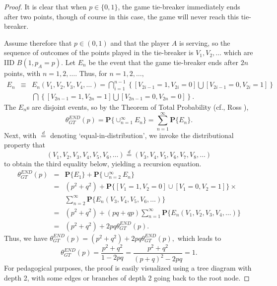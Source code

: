 \documentclass[11pt]{article}
\theoremstyle{plain}
\theoremstyle{definition}
\renewcommand{\Pr}{\mathbf{P}}
\begin{document}
\begin{proof}
    It is clear that when $p \in \{0,1\}$, the game tie-breaker immediately ends after two points, though of course in this case, the game will never reach this tie-breaker.

 Assume therefore that $p \in (0,1)$ and that the player $A$ is serving, so the sequence of outcomes of the points played in the tie-breaker is $V_1, V_2, \ldots$ which are IID $B(1,p_A = p)$. Let $E_n$ be the event that the game tie-breaker ends after $2n$ points, with $n = 1,2,\ldots$. Thus, for $n = 1,2,\ldots,$
    \begin{eqnarray*}
    E_n & \equiv & E_n(V_1, V_2, V_3, V_4, \ldots) 
    =  \bigcap_{i=1}^{n-1} \left\{[ V_{2i-1}  = 1,V_{2i} = 0 ]  \bigcup [ V_{2i-1} = 0, V_{2i} = 1 ] \right\}  \\ && \bigcap \left\{ [ V_{2n-1} = 1, V_{2n} = 1 ] \bigcup [ V_{2n-1} = 0, V_{2n} = 0 ]\right\}.
    \end{eqnarray*}
    The $E_n$s are disjoint events, so by the Theorem of Total Probability (cf., Ross \cite{Ross1998}),
    $$\theta_{GT}^{END}(p) = \Pr\{\cup_{n=1}^\infty E_n\} = \sum_{n=1}^\infty \Pr\{E_n\}.$$
    Next, with $\stackrel{d}{=}$ denoting `equal-in-distribution', we invoke the distributional property that
    $$(V_1,V_2,V_3, V_4, V_5,V_6, \ldots) \stackrel{d}{=} (V_3, V_4, V_5,V_6, V_7,V_8, \ldots)$$
    to obtain the third equality below, yielding a recursion equation.
    \begin{eqnarray*}
        \theta_{GT}^{END}(p) & = & \Pr\{E_1\} + \Pr\{\cup_{n=2}^\infty E_n\} \\
         & =  & (p^2 + q^2) + \Pr\{[V_1=1,V_2=0] \cup [V_1=0,V_2=1]\} \times \\ &&  \sum_{n=2}^\infty \Pr\{E_n(V_3,V_4,V_5,V_6,\ldots)\} \\
        & = & (p^2 + q^2) + (pq + qp) \sum_{n=1}^\infty \Pr\{E_n(V_1,V_2,V_3,V_4,\ldots)\} \\
         & = &  (p^2 + q^2) + 2pq \theta_{GT}^{END}(p).
    \end{eqnarray*}
    Thus, we have
%
    $\theta_{GT}^{END}(p) = (p^2 + q^2) + 2pq \theta_{GT}^{END}(p),$
    which leads to $$\theta_{GT}^{END}(p) = \frac{p^2 + q^2}{1-2pq} = \frac{p^2+q^2}{(p+q)^2 - 2pq} = 1.$$
    For pedagogical purposes, the proof is easily visualized using a tree diagram with depth 2, with some edges or branches of depth 2 going back to the root node.
\end{proof}
\end{document}
